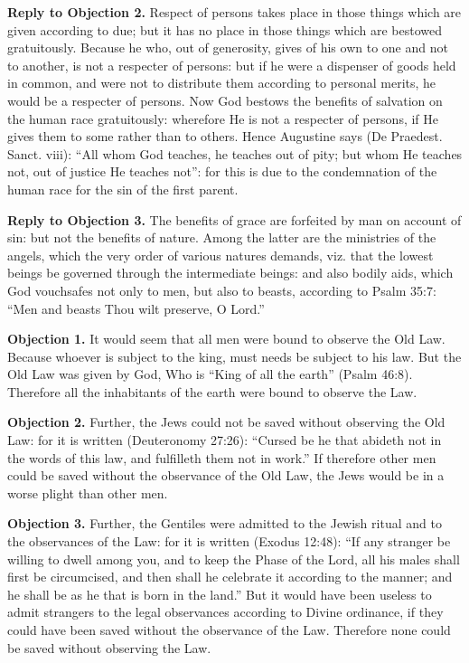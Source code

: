 \textbf{Reply to Objection 2.} Respect of persons takes place in those things which are given according to due; but it has no place in those things which are bestowed gratuitously. Because he who, out of generosity, gives of his own to one and not to another, is not a respecter of persons: but if he were a dispenser of goods held in common, and were not to distribute them according to personal merits, he would be a respecter of persons. Now God bestows the benefits of salvation on the human race gratuitously: wherefore He is not a respecter of persons, if He gives them to some rather than to others. Hence Augustine says (De Praedest. Sanct. viii): ``All whom God teaches, he teaches out of pity; but whom He teaches not, out of justice He teaches not'': for this is due to the condemnation of the human race for the sin of the first parent.

\textbf{Reply to Objection 3.} The benefits of grace are forfeited by man on account of sin: but not the benefits of nature. Among the latter are the ministries of the angels, which the very order of various natures demands, viz. that the lowest beings be governed through the intermediate beings: and also bodily aids, which God vouchsafes not only to men, but also to beasts, according to Psalm 35:7: ``Men and beasts Thou wilt preserve, O Lord.''


\textbf{Objection 1.} It would seem that all men were bound to observe the Old Law. Because whoever is subject to the king, must needs be subject to his law. But the Old Law was given by God, Who is ``King of all the earth'' (Psalm 46:8). Therefore all the inhabitants of the earth were bound to observe the Law.

\textbf{Objection 2.} Further, the Jews could not be saved without observing the Old Law: for it is written (Deuteronomy 27:26): ``Cursed be he that abideth not in the words of this law, and fulfilleth them not in work.'' If therefore other men could be saved without the observance of the Old Law, the Jews would be in a worse plight than other men.

\textbf{Objection 3.} Further, the Gentiles were admitted to the Jewish ritual and to the observances of the Law: for it is written (Exodus 12:48): ``If any stranger be willing to dwell among you, and to keep the Phase of the Lord, all his males shall first be circumcised, and then shall he celebrate it according to the manner; and he shall be as he that is born in the land.'' But it would have been useless to admit strangers to the legal observances according to Divine ordinance, if they could have been saved without the observance of the Law. Therefore none could be saved without observing the Law.

